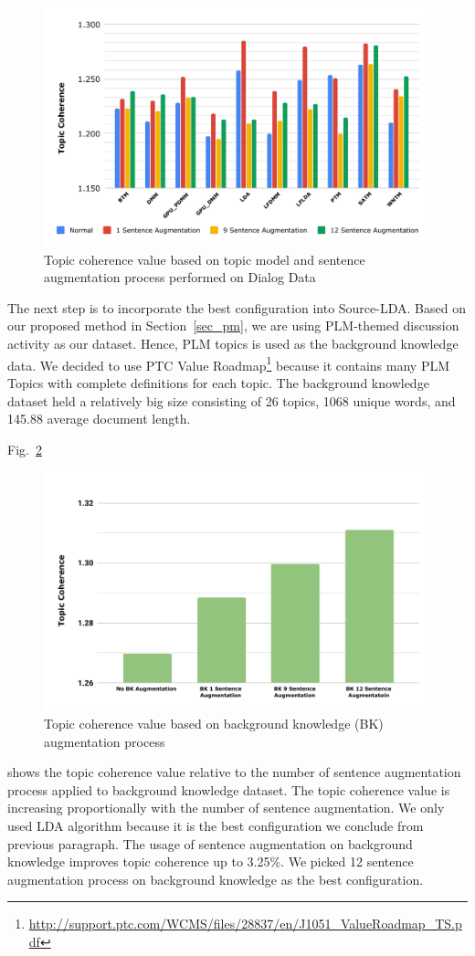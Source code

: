 \documentclass[10pt, conference, compsocconf]{IEEEtran}
\begin{document}
\begin{figure}[t]
	\includegraphics[scale=0.425]{new-topic1.pdf}
	\caption{Topic coherence value based on topic model and sentence augmentation process performed on Dialog Data}
\label{fig_tme}
\end{figure}

The next step is to incorporate the best configuration into  Source-LDA. Based on our proposed method in Section~\ref{sec_pm}, we are using PLM-themed discussion activity as our dataset. Hence, PLM topics is used as the background knowledge data. We decided to use PTC Value Roadmap\footnote{\url{http://support.ptc.com/WCMS/files/28837/en/J1051_ValueRoadmap_TS.pdf}} because it contains many PLM Topics with complete definitions for each topic. The background knowledge dataset held a relatively big size consisting of 26 topics, 1068 unique words, and 145.88 average document length. 

Fig.~\ref{fig_tme2}
\begin{figure}[b]
	\includegraphics[scale=0.425]{new-topic2.pdf}
	\caption{Topic coherence value based on background knowledge (BK) augmentation process}
\label{fig_tme2}
\end{figure}
shows the topic coherence value relative to the number of sentence augmentation process applied to background knowledge dataset. The topic coherence value is increasing proportionally with the number of sentence augmentation. We only used LDA algorithm because it is the best configuration we conclude from previous paragraph. The usage of sentence augmentation on background knowledge improves topic coherence up to 3.25\%. We picked 12 sentence augmentation process on background knowledge as the best configuration.
\end{document}
